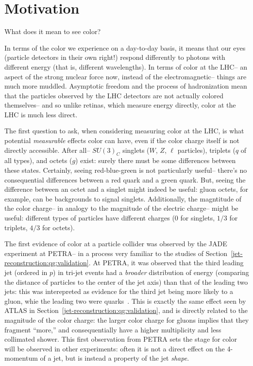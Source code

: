 \label{chapter:color}
\section{Motivation}

What does it mean to see color?

In terms of the color we experience on a day-to-day basis, it means that our eyes (particle detectors in their own right!) respond differently to photons with different energy (that is, different wavelengths). In terms of color at the LHC-- an aspect of the strong nuclear force now, instead of the electromagnetic-- things are much more muddled. Asymptotic freedom and the process of hadronization mean that the particles observed by the LHC detectors are not actually colored themselves-- and so unlike retinas, which measure energy directly, color at the LHC is much less direct.

The first question to ask, when considering measuring color at the LHC, is what potential \textit{measurable} effects color can have, even if the color charge itself is not directly accessible. After all-- $SU(3)_C$ singlets ($W$, $Z$, $\ell$ particles), triplets ($q$ of all types), and octets ($g$) exist: surely there must be some differences between these states. Certainly, seeing red-blue-green is not particularly useful-- there's no consequential differences between a red quark and a green quark. But, seeing the difference between an octet and a singlet might indeed be useful: gluon octets, for example, can be backgrounds to signal singlets. Additionally, the magntitude of the color charge-- in analogy to the magnitude of the electric charge-- might be useful: different types of particles have different  charges (0 for singlets, $1/3$ for triplets, $4/3$ for octets). 

The first evidence of color at a particle collider was observed by the JADE experiment at PETRA-- in a process very familiar to the studies of Section~\ref{jet-reconstruction:qg:validation}. At PETRA, it was observed that the third leading jet (ordered in $p$) in tri-jet events had a \textit{broader} distribution of energy (comparing the distance of particles to the center of the jet axis) than that of the leading two jets: this was interepreted as evidence for the third jet being more likely to a gluon, whie the leading two were quarks~\cite{Bartel:1983ii}. This is exactly the same effect seen by ATLAS in Section~\ref{jet-reconstruction:qg:validation}, and is directly related to the magnitude of the color charge: the larger color charge for gluons implies that they fragment ``more,'' and consequentially have a higher multiplicity and less collimated shower. This first observation from PETRA sets the stage for color will be observed in other experiments: often it is not a direct effect on the 4-momentum of a jet, but is instead a property of the jet \textit{shape}. 

